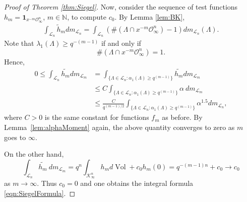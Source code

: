 \documentclass[11pt,a4paper,reqno]{amsart}
\theoremstyle{definition}
\theoremstyle{remark}
\numberwithin{equation}{section}
\begin{document}
\begin{proof}[Proof of Theorem \ref{thm:Siegel}]
Now, consider the sequence of test functions $h_m=\mathbf{1}_{x^{-m}\mathcal{O}_{\infty}^n}$, $m\in \mathbb N$, to compute $c_0$. By Lemma \ref{lem:BK}, 
\begin{equation}
\begin{split}
\label{eqn:STSmallBalls}
    \int_{\mathcal{L}_n}\widetilde{h}_mdm_{\mathcal{L}_n}=\int_{\mathcal{L}_n}\left(\#\left(\Lambda\cap x^{-m}\mathcal{O}_{\infty}^n\right)-1\right)dm_{\mathcal{L}_n}(\Lambda).
\end{split}
\end{equation}
Note that $\lambda_1(\Lambda)\geq q^{-(m-1)}$ if and only if
\[
\#\left(\Lambda\cap x^{-m}\mathcal{O}_{\infty}^n\right)=1.
\]
Hence,
\[\begin{split}
0\le
\int_{\mathcal L_n} \widetilde{h_m} dm_{\mathcal L_m}
&=\int_{\{\Lambda\in \mathcal L_n: \alpha_1(\Lambda)\ge q^{(m-1)}\}} \widetilde{h_m} dm_{\mathcal L_m}\\
&\le C \int_{\{\Lambda\in \mathcal L_n: \alpha_1(\Lambda)\ge q^{(m-1)}\}} \alpha\:dm_{\mathcal L_m}\\
&\le \frac {C} {q^{(m-1)/2}} \int_{\{\Lambda\in \mathcal L_n: \alpha_1(\Lambda)\ge q^{(m-1)}\}} \alpha^{1.5} dm_{\mathcal L_n},
\end{split}\]
where $C>0$ is the same constant for functions $f_m$ as before. By Lemma~\ref{lem:alphaMoment} again, the above quantity converges to zero as $m$  goes to $\infty$.

On the other hand,
\begin{equation}
\int_{\mathcal L_n} \widetilde{h_m} \:dm_{\mathcal L_m}=    q^n\int_{\mathcal{K}_{\infty}^n}h_md\operatorname{Vol}+c_0h_m(0)=q^{-(m-1)n}+c_0\rightarrow c_0
\end{equation}
as $m\rightarrow \infty$. Thus $c_0=0$ and one obtains the integral formula \eqref{eqn:SiegelFormula}.
\end{proof}
\end{document}
